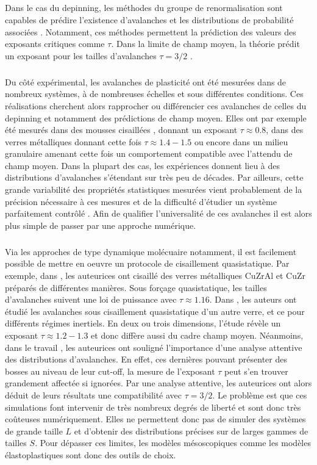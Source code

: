 \subparagraph{}Dans le cas du depinning, les méthodes du groupe de renormalisation sont capables de prédire l'existence d'avalanches et les distributions de probabilité associées \cite{wiese_theory_2022}. Notamment, ces méthodes permettent la prédiction des valeurs des exposants critiques comme $\tau$. Dans la limite de champ moyen, la théorie prédit un exposant pour les tailles d'avalanches $\tau = 3/2$ \cite{le_doussal_size_2009}.

\subparagraph{}Du côté expérimental, les avalanches de plasticité ont été mesurées dans de nombreux systèmes, à de nombreuses échelles et sous différentes conditions. Ces réalisations cherchent alors rapprocher ou différencier ces avalanches de celles du depinning et notamment des prédictions de champ moyen. Elles ont par exemple été mesurés dans des mousses cisaillées \cite{lauridsen_shear-induced_2002}, donnant un exposant $\tau\approx 0.8$, dans des verres métalliques \cite{sun_plasticity_2010} donnant cette fois $\tau\approx 1.4-1.5$ ou encore dans un milieu granulaire \cite{denisov_universality_2016} amenant cette fois un comportement compatible avec l'attendu de champ moyen. Dans la plupart des cas, les expériences donnent lieu à des distributions d'avalanches s'étendant sur très peu de décades. Par ailleurs, cette grande variabilité des propriétés statistiques mesurées vient probablement de la précision nécessaire à ces mesures et de la difficulté d'étudier un système parfaitement contrôlé \cite{bonn_yield_2017}. Afin de qualifier l'universalité de ces avalanches il est alors plus simple de passer par une approche numérique.

\subparagraph{}Via les approches de type dynamique molécuaire notamment, il est facilement possible de mettre en oeuvre un protocole de cisaillement quasistatique. Par exemple, dans \cite{makinen_avalanches_2025}, les auteurices ont cisaillé des verres métalliques CuZrAl et CuZr préparés de différentes manières. Sous forçage quasistatique, les tailles d'avalanches suivent une loi de puissance avec $\tau \approx 1.16$. Dans \cite{salerno_effect_2013}, les auteurs ont étudié les avalanches sous cisaillement quasistatique d'un autre verre, et ce pour différents régimes inertiels. En deux ou trois dimensions, l'étude révèle un exposant $\tau \approx 1.2-1.3$ et donc diffère aussi du cadre champ moyen. Néanmoins, dans le travail \cite{oyama_unified_2021}, les auteurices ont souligné l'importance d'une analyse attentive des distributions d'avalanches. En effet, ces dernières pouvant présenter des bosses au niveau de leur cut-off, la mesure de l'exposant $\tau$ peut s'en trouver grandement affectée si ignorées. Par une analyse attentive, les auteurices ont alors déduit de leurs résultats une compatibilité avec $\tau=3/2$. Le problème est que ces simulations font intervenir de très nombreux degrés de liberté et sont donc très coûteuses numériquement. Elles ne permettent donc pas de simuler des systèmes de grande taille $L$ et d'obtenir des distributions précises sur de larges gammes de tailles $S$. Pour dépasser ces limites, les modèles mésoscopiques comme les modèles élastoplastiques sont donc des outils de choix.

